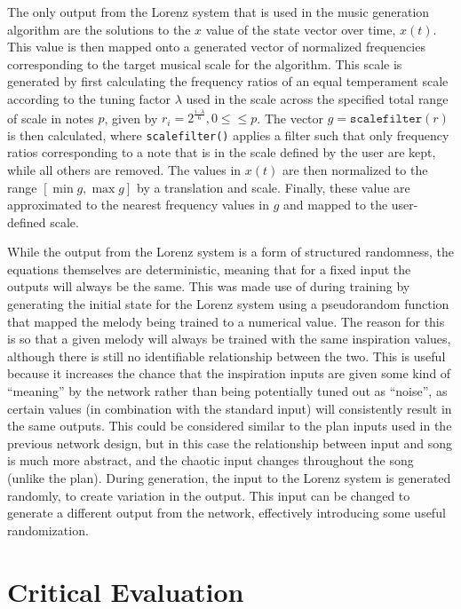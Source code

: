 \documentclass[ author={Stephen Livermore-Tozer},
				supervisor={Dr. Peter Flach},
				degree={MEng},
				title={Algorithmic Co-composition Using Machine Learning},
				subtitle={},
				type={research},
				year={2016} ]{dissertation}
\begin{document}
	The only output from the Lorenz system that is used in the music generation algorithm are the solutions to the $x$ value of the state vector over time, $x(t)$. This value is then mapped onto a generated vector of normalized frequencies corresponding to the target musical scale for the algorithm. This scale is generated by first calculating the frequency ratios of an equal temperament scale according to the tuning factor $\lambda$ used in the scale across the specified total range of scale in notes $p$, given by $r_i = 2^{\frac{i \cdot \lambda}{6}}, 0 \leq\leq p$. The vector $g = \mathtt{scalefilter}(r)$ is then calculated, where \texttt{scalefilter()} applies a filter such that only frequency ratios corresponding to a note that is in the scale defined by the user are kept, while all others are removed. The values in $x(t)$ are then normalized to the range $[\min g, \max g]$ by a translation and scale. Finally, these value are approximated to the nearest frequency values in $g$ and mapped to the user-defined scale.
	
	While the output from the Lorenz system is a form of structured randomness, the equations themselves are deterministic, meaning that for a fixed input the outputs will always be the same. This was made use of during training by generating the initial state for the Lorenz system using a pseudorandom function that mapped the melody being trained to a numerical value. The reason for this is so that a given melody will always be trained with the same inspiration values, although there is still no identifiable relationship between the two. This is useful because it increases the chance that the inspiration inputs are given some kind of ``meaning'' by the network rather than being potentially tuned out as ``noise'', as certain values (in combination with the standard input) will consistently result in the same outputs. This could be considered similar to the plan inputs used in the previous network design, but in this case the relationship between input and song is much more abstract, and the chaotic input changes throughout the song (unlike the plan). During generation, the input to the Lorenz system is generated randomly, to create variation in the output. This input can be changed to generate a different output from the network, effectively introducing some useful randomization. 
	
	
	
	
	\chapter{Critical Evaluation}
	\label{chap:evaluation}
	
\end{document}
